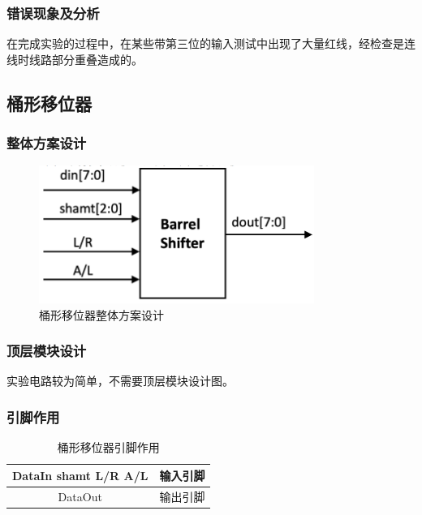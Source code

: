 \documentclass{article}
\begin{document}
    \subsubsection{错误现象及分析}
    在完成实验的过程中，在某些带第三位的输入测试中出现了大量红线，经检查是连线时线路部分重叠造成的。

    \subsection{桶形移位器}

    \subsubsection{整体方案设计}
    \begin{figure}[H]
    \centering
    \includegraphics[width=0.8\textwidth]{6.1.png}
    \caption{桶形移位器整体方案设计}
    \end{figure}
    
    \subsubsection{顶层模块设计}
    实验电路较为简单，不需要顶层模块设计图。

    \subsubsection{引脚作用}
    \begin{table}[H]
    \centering
    \begin{tabular}{|c|c|}
        \hline
        DataIn shamt L/R A/L & 输入引脚 \\ \hline
        DataOut & 输出引脚 \\ \hline
    \end{tabular}
    \caption{桶形移位器引脚作用}
    \end{table}
\end{document}
